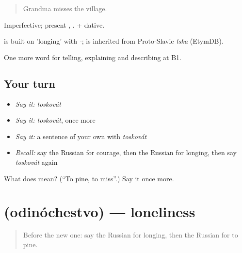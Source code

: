 \begin{quote}
Grandma misses the village.
\end{quote}

Imperfective; present , . \emph{ } + dative.

\begin{cousinweb}
\emph{} is built on \emph{} 'longing' with \emph{-}; \emph{} is inherited from Proto-Slavic \emph{tska} (EtymDB).
\end{cousinweb}

\begin{grammarlens}[title={What you've built}]
One more word for telling, explaining and describing at B1.
\end{grammarlens}

\subsection*{Your turn}
\begin{itemize}
\raggedright
  \item \emph{Say it:} \emph{toskovát}
  \item \emph{Say it:} \emph{toskovát}, once more
  \item \emph{Say it:} a sentence of your own with \emph{toskovát}
  \item \emph{Recall:} say the Russian for courage, then the Russian for longing, then say \emph{toskovát} again
\end{itemize}

\begin{tcolorbox}[breakable,colback=teal!4,colframe=teal!35!black,title={Before you move on}]
What does  mean? (\textquotedblleft{}To pine, to miss\textquotedblright{}.) Say it once more.
\end{tcolorbox}
\section[\texorpdfstring{\ru{одиночество} (odinóchestvo)}{одиночество (odinóchestvo)}]{ (odinóchestvo) — loneliness}

\label{lesson:RU-C477-odinochestvo}



\begin{quote}
Before the new one: say the Russian for longing, then the Russian for to pine.
\end{quote}


